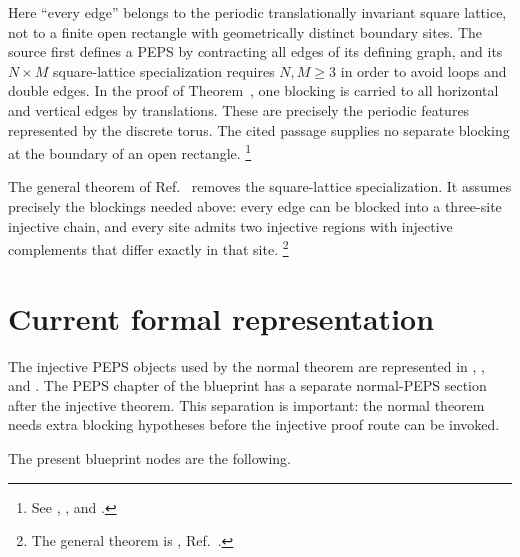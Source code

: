\documentclass{article}
\begin{document}
Here ``every edge'' belongs to the periodic translationally invariant
square lattice, not to a finite open rectangle with geometrically distinct
boundary sites. The source first defines a PEPS by contracting all edges of
its defining graph, and its $N\times M$ square-lattice specialization requires
$N,M\geq3$ in order to avoid loops and double edges. In the proof of
Theorem~, one blocking is carried to all horizontal and vertical edges
by translations. These are precisely the periodic features represented by
the discrete torus. The cited passage supplies no separate blocking at the
boundary of an open rectangle.
\footnote{See
    ,
    , and
    .}

The general theorem  of Ref.~\cite{Molnar2018NormalPEPS}
removes the square-lattice specialization.
It assumes precisely the blockings needed above: every edge can be blocked into
a three-site injective chain, and every site admits two injective regions with
injective complements that differ exactly in that site.
\footnote{The general theorem is
    , Ref.~\cite{Molnar2018NormalPEPS}.}

\section{Current formal representation}

The injective PEPS objects used by the normal theorem are represented in
, , and
. The PEPS chapter of the blueprint has a
separate normal-PEPS section after the injective theorem. This separation is
important: the normal theorem needs extra blocking hypotheses before the
injective proof route can be invoked.

The present blueprint nodes are the following.
\end{document}
